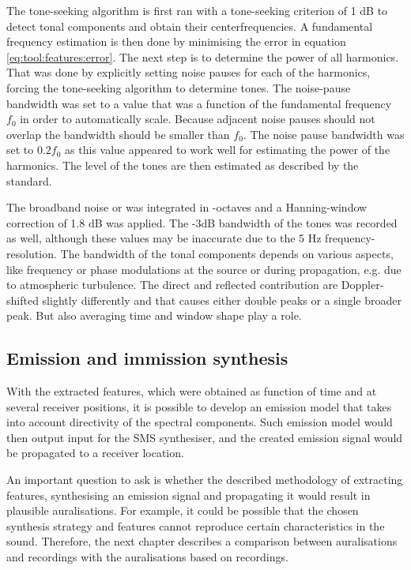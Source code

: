 \documentclass[10pt,twocolumn]{article}
\begin{document}
The tone-seeking algorithm is first ran with a tone-seeking criterion of 1 dB to
detect tonal components and obtain their centerfrequencies. A fundamental
frequency estimation is then done by minimising the error in equation
\eqref{eq:tool:features:error}. The next step is to determine the power of all
harmonics. That was done by explicitly setting noise pauses for each of the
harmonics, forcing the tone-seeking algorithm to determine tones.
The noise-pause bandwidth was set to a value that was a function of the fundamental
frequency $f_0$ in order to automatically scale. Because adjacent noise pauses
should not overlap the bandwidth should be smaller than $f_0$. The noise pause
bandwidth was set to $0.2 f_0$ as this value appeared to work well for
estimating the power of the  harmonics. The level of the tones are
then estimated as described by the standard.

The broadband noise or  was integrated in
-octaves and a Hanning-window correction of 1.8 dB was applied.
The -3dB bandwidth of the tones was recorded as well, although these values may
be inaccurate due to the 5 Hz frequency-resolution. The bandwidth of the tonal
components depends on various aspects, like frequency or phase modulations at
the source or during propagation, e.g. due to atmospheric turbulence. The direct
and reflected contribution are Doppler-shifted slightly differently and that
causes either double peaks or a single broader peak. But also averaging time and
window shape play a role.

\subsection{Emission and immission synthesis}\label{sec:tool:synthesis:synthesis}
With the extracted features, which were obtained as function of time and at
several receiver positions, it is possible to develop an emission model that
takes into account directivity of the spectral components. Such emission model
would then output input for the SMS synthesiser, and the created emission signal
would be propagated to a receiver location.

An important question to ask is whether the described methodology of extracting
features, synthesising an emission signal and propagating it would result in
plausible auralisations. For example, it could be possible that the chosen
synthesis strategy and features cannot reproduce certain characteristics in the
sound. Therefore, the next chapter describes a comparison between auralisations
and recordings with the auralisations based on recordings.
\end{document}
